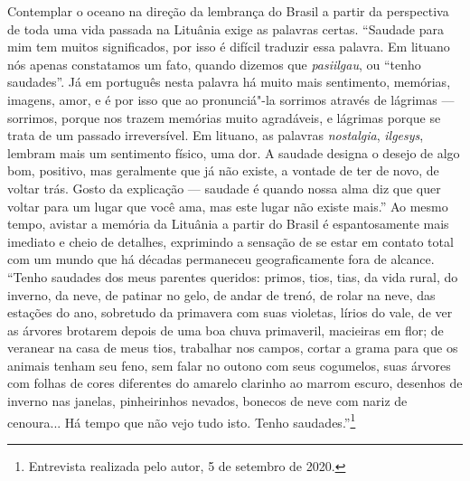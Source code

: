 Contemplar o oceano na direção da lembrança do Brasil a partir da
perspectiva de toda uma vida passada na Lituânia exige as palavras
certas. ``Saudade para mim tem muitos significados, por isso é difícil
traduzir essa palavra. Em lituano nós apenas constatamos um fato, quando
dizemos que \textit{pasiilgau}, ou ``tenho saudades''. Já em português nesta
palavra há muito mais sentimento, memórias, imagens, amor, e é por
isso que ao pronunciá"-la sorrimos através de lágrimas --- sorrimos,
porque nos trazem memórias muito agradáveis, e lágrimas porque se trata
de um passado irreversível. Em lituano, as palavras
\textit{nostalgia}, \textit{ilgesys}, lembram mais um sentimento
físico, uma dor. A saudade designa o desejo de algo bom, positivo, mas
geralmente que já não existe, a vontade de ter de novo, de voltar trás.
Gosto da explicação --- saudade é quando nossa alma diz que quer voltar
para um lugar que você ama, mas este lugar não existe mais.'' Ao mesmo
tempo, avistar a memória da Lituânia a partir do Brasil é espantosamente
mais imediato e cheio de detalhes, exprimindo a sensação de se estar em
contato total com um mundo que há décadas permaneceu geograficamente
fora de alcance. ``Tenho saudades dos meus parentes queridos: primos,
tios, tias, da vida rural, do inverno, da neve, de patinar no gelo, de
andar de trenó, de rolar na neve, das estações do ano, sobretudo da
primavera com suas violetas, lírios do vale, de ver as árvores brotarem
depois de uma boa chuva primaveril, macieiras em flor; de veranear na
casa de meus tios, trabalhar nos campos, cortar a grama para que os
animais tenham seu feno, sem falar no outono com seus cogumelos, suas
árvores com folhas de cores diferentes do amarelo clarinho ao marrom
escuro, desenhos de inverno nas janelas, pinheirinhos nevados, bonecos
de neve com nariz de cenoura... Há tempo que não vejo tudo isto. Tenho
saudades.''\footnote{Entrevista realizada pelo autor, 5 de setembro de
  2020.}


